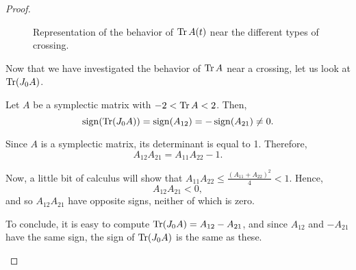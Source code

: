 \begin{proof}
\begin{figure}
\caption{Representation of the behavior of $\operatorname{Tr} A(t)$ near the different types of crossing.}\label{fig:trace}
\end{figure}

Now that we have investigated the behavior of $\operatorname{Tr} A$ near a crossing, let us look at $\operatorname{Tr}(J_0 A)$.

\begin{lemma}\label{lemma:smtrace}
Let $A$ be a symplectic matrix with $-2 < \operatorname{Tr} A < 2$. Then,
\begin{equation}
\operatorname{sign}(\operatorname{Tr}(J_0 A)) = \operatorname{sign}(A_{12}) = -\operatorname{sign}(A_{21}) \neq 0.
\end{equation}
\end{lemma}

\begin{lemmaproof}
Since $A$ is a symplectic matrix, its determinant is equal to 1. Therefore,
\begin{equation}
A_{12} A_{21} = A_{11} A_{22} - 1.
\end{equation}

Now, a little bit of calculus will show that $A_{11} A_{22} \leq \frac{(A_{11} + A_{22})^2}4 < 1$. Hence,
\begin{equation}
A_{12} A_{21} < 0,
\end{equation}
and so $A_{12} A_{21}$ have opposite signs, neither of which is zero.

To conclude, it is easy to compute $\operatorname{Tr}(J_0 A) = A_{12} - A_{21}$, and since $A_{12}$ and $-A_{21}$ have the same sign, the sign of $\operatorname{Tr}(J_0 A)$ is the same as these.
\end{lemmaproof}


\end{proof}
